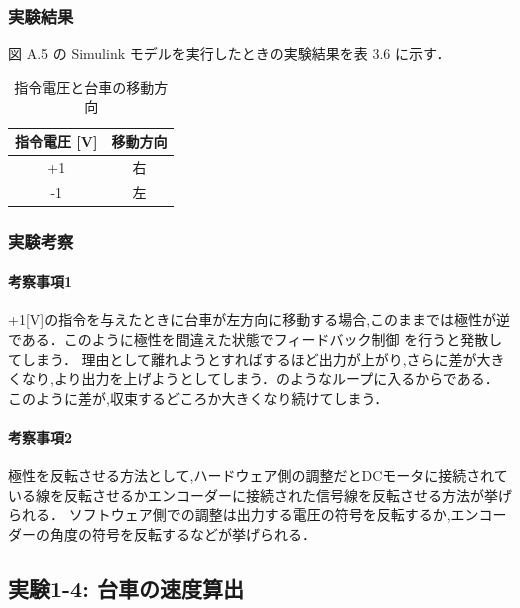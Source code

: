 \subsubsection{実験結果}
図 A.5 の Simulink モデルを実行したときの実験結果を表 3.6 に示す．

\begin{table}[h]
  \centering
  \caption{指令電圧と台車の移動方向}
  \label{tab:command_voltage_direction}
  \begin{tabular}{|c|c|}
    \hline
    指令電圧 [V] & 移動方向 \\
    \hline
    +1           & 右       \\
    \hline
    -1           & 左       \\
    \hline
  \end{tabular}
\end{table}

\subsubsection{実験考察}
\paragraph{考察事項1}
+1[V]の指令を与えたときに台車が左方向に移動する場合,このままでは極性が逆である．このように極性を間違えた状態でフィードバック制御
を行うと発散してしまう．
理由として離れようとすればするほど出力が上がり,さらに差が大きくなり,より出力を上げようとしてしまう．のようなループに入るからである．
このように差が,収束するどころか大きくなり続けてしまう．

\paragraph{考察事項2}
極性を反転させる方法として,ハードウェア側の調整だとDCモータに接続されている線を反転させるかエンコーダーに接続された信号線を反転させる方法が挙げられる．
ソフトウェア側での調整は出力する電圧の符号を反転するか,エンコーダーの角度の符号を反転するなどが挙げられる．


\subsection{実験1-4: 台車の速度算出}


